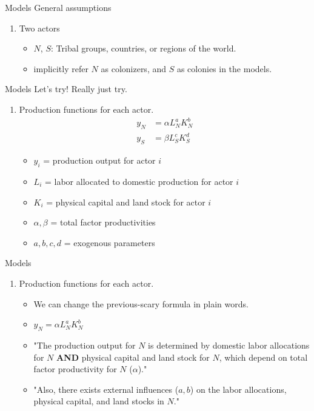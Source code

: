 \documentclass[xcolor=dvipsnames]{beamer}
\begin{document}
	\begin{frame}[fragile]{Models}
		General assumptions
		\begin{enumerate}
			\item Two actors
			\begin{itemize}
				\item $N$, $S$: Tribal groups, countries, or regions of the world.
				\item \citet{Gartzke2011} implicitly refer $N$ as colonizers, and $S$ as colonies in the models.
			\end{itemize}
		\end{enumerate}
	\end{frame}
	
	\begin{frame}[fragile]{Models}
		Let's try! \pause Really just try. \pause
		\begin{enumerate}[2]
			\item Production functions for each actor.
			\begin{equation*}
				\begin{aligned}
					y_{N}&= \alpha L^{a}_{N}K^{b}_{N}\\
					y_{S}&= \beta L^{c}_{S}K^{d}_{S}
				\end{aligned}
			\end{equation*}
			\begin{itemize}
				\item $y_{i}$ = production output for actor $i$
				\item $L_{i}$ = labor allocated to domestic production for actor $i$
				\item $K_{i}$ = physical capital and land stock for actor $i$
				\item $\alpha, \beta$ = total factor productivities
				\item $a, b, c, d$ = exogenous parameters
			\end{itemize}
		\end{enumerate}
	\end{frame}
	
	\begin{frame}[fragile]{Models}
		\begin{enumerate}[2]
			\item Production functions for each actor.
			\begin{itemize}
				\item We can change the previous-scary formula in plain words.
				\item $y_{N}= \alpha L^{a}_{N}K^{b}_{N}$
				\item "The production output for $N$ is determined by domestic labor allocations for $N$ \textbf{AND} physical capital and land stock for $N$, which depend on total factor productivity for $N$ ($\alpha$)."
				\item "Also, there exists external influences ($a, b$) on the labor allocations, physical capital, and land stocks in $N$."
			\end{itemize}
		\end{enumerate}
	\end{frame}
	
\end{document}
